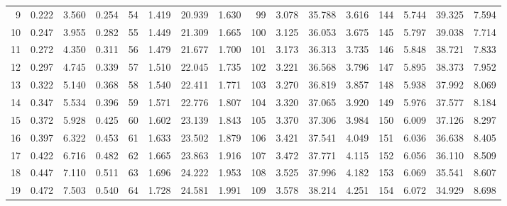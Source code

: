 \begin{table}[!h]
{\begin{tabular}{rrrr|rrrr|rrrr|rrrr}
  9 & \tiny{  0.222} &   3.560 & \tiny{  0.254} &  54 & \tiny{  1.419} &  20.939 & \tiny{  1.630} &  99 & \tiny{  3.078} &  35.788 & \tiny{  3.616} & 144 & \tiny{  5.744} &  39.325 & \tiny{  7.594}\\
 10 & \tiny{  0.247} &   3.955 & \tiny{  0.282} &  55 & \tiny{  1.449} &  21.309 & \tiny{  1.665} & 100 & \tiny{  3.125} &  36.053 & \tiny{  3.675} & 145 & \tiny{  5.797} &  39.038 & \tiny{  7.714}\\
 11 & \tiny{  0.272} &   4.350 & \tiny{  0.311} &  56 & \tiny{  1.479} &  21.677 & \tiny{  1.700} & 101 & \tiny{  3.173} &  36.313 & \tiny{  3.735} & 146 & \tiny{  5.848} &  38.721 & \tiny{  7.833}\\
 12 & \tiny{  0.297} &   4.745 & \tiny{  0.339} &  57 & \tiny{  1.510} &  22.045 & \tiny{  1.735} & 102 & \tiny{  3.221} &  36.568 & \tiny{  3.796} & 147 & \tiny{  5.895} &  38.373 & \tiny{  7.952}\\
 13 & \tiny{  0.322} &   5.140 & \tiny{  0.368} &  58 & \tiny{  1.540} &  22.411 & \tiny{  1.771} & 103 & \tiny{  3.270} &  36.819 & \tiny{  3.857} & 148 & \tiny{  5.938} &  37.992 & \tiny{  8.069}\\
 14 & \tiny{  0.347} &   5.534 & \tiny{  0.396} &  59 & \tiny{  1.571} &  22.776 & \tiny{  1.807} & 104 & \tiny{  3.320} &  37.065 & \tiny{  3.920} & 149 & \tiny{  5.976} &  37.577 & \tiny{  8.184}\\
 15 & \tiny{  0.372} &   5.928 & \tiny{  0.425} &  60 & \tiny{  1.602} &  23.139 & \tiny{  1.843} & 105 & \tiny{  3.370} &  37.306 & \tiny{  3.984} & 150 & \tiny{  6.009} &  37.126 & \tiny{  8.297}\\
 16 & \tiny{  0.397} &   6.322 & \tiny{  0.453} &  61 & \tiny{  1.633} &  23.502 & \tiny{  1.879} & 106 & \tiny{  3.421} &  37.541 & \tiny{  4.049} & 151 & \tiny{  6.036} &  36.638 & \tiny{  8.405}\\
 17 & \tiny{  0.422} &   6.716 & \tiny{  0.482} &  62 & \tiny{  1.665} &  23.863 & \tiny{  1.916} & 107 & \tiny{  3.472} &  37.771 & \tiny{  4.115} & 152 & \tiny{  6.056} &  36.110 & \tiny{  8.509}\\
 18 & \tiny{  0.447} &   7.110 & \tiny{  0.511} &  63 & \tiny{  1.696} &  24.222 & \tiny{  1.953} & 108 & \tiny{  3.525} &  37.996 & \tiny{  4.182} & 153 & \tiny{  6.069} &  35.541 & \tiny{  8.607}\\
 19 & \tiny{  0.472} &   7.503 & \tiny{  0.540} &  64 & \tiny{  1.728} &  24.581 & \tiny{  1.991} & 109 & \tiny{  3.578} &  38.214 & \tiny{  4.251} & 154 & \tiny{  6.072} &  34.929 & \tiny{  8.698}\\

\end{tabular}}
\end{table}
